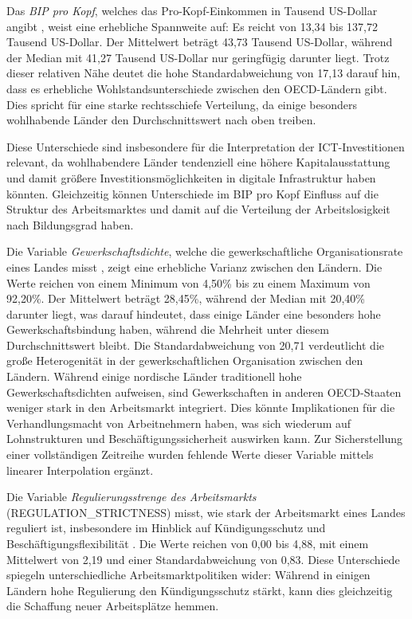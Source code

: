 Das \textit{\ac{BIP} pro Kopf}, welches das Pro-Kopf-Einkommen in Tausend US-Dollar angibt 
\parencite{oecd2022gdp}, weist eine erhebliche Spannweite auf: Es reicht von 13,34 bis 
137,72 Tausend US-Dollar. Der Mittelwert beträgt 43,73 Tausend US-Dollar, während der 
Median mit 41,27 Tausend US-Dollar nur geringfügig darunter liegt. Trotz dieser relativen 
Nähe deutet die hohe Standardabweichung von 17,13 darauf hin, dass es erhebliche 
Wohlstandsunterschiede zwischen den \ac{OECD}-Ländern gibt. Dies spricht für eine starke 
rechtsschiefe Verteilung, da einige besonders wohlhabende Länder den Durchschnittswert 
nach oben treiben.

Diese Unterschiede sind insbesondere für die Interpretation der \ac{ICT}-Investitionen 
relevant, da wohlhabendere Länder tendenziell eine höhere Kapitalausstattung und damit 
größere Investitionsmöglichkeiten in digitale Infrastruktur haben könnten. Gleichzeitig 
können Unterschiede im \ac{BIP} pro Kopf Einfluss auf die Struktur des Arbeitsmarktes und 
damit auf die Verteilung der Arbeitslosigkeit nach Bildungsgrad haben.

Die Variable \textit{Gewerkschaftsdichte}, welche die gewerkschaftliche Organisationsrate 
eines Landes misst \parencite{oecd2022tud}, zeigt eine erhebliche Varianz zwischen den 
Ländern. Die Werte reichen von einem Minimum von 4,50\% bis zu einem Maximum von 92,20\%. 
Der Mittelwert beträgt 28,45\%, während der Median mit 20,40\% darunter liegt, was darauf 
hindeutet, dass einige Länder eine besonders hohe Gewerkschaftsbindung haben, während die 
Mehrheit unter diesem Durchschnittswert bleibt. Die Standardabweichung von 20,71 
verdeutlicht die große Heterogenität in der gewerkschaftlichen Organisation zwischen den 
Ländern. Während einige nordische Länder traditionell hohe Gewerkschaftsdichten aufweisen, 
sind Gewerkschaften in anderen \ac{OECD}-Staaten weniger stark in den Arbeitsmarkt 
integriert. Dies könnte Implikationen für die Verhandlungsmacht von Arbeitnehmern haben, 
was sich wiederum auf Lohnstrukturen und Beschäftigungssicherheit auswirken kann.  
Zur Sicherstellung einer vollständigen Zeitreihe wurden fehlende Werte dieser Variable mittels linearer Interpolation ergänzt.

Die Variable \textit{Regulierungsstrenge des Arbeitsmarkts} (REGULATION\_STRICTNESS) misst, 
wie stark der Arbeitsmarkt eines Landes reguliert ist, insbesondere im Hinblick auf 
Kündigungsschutz und Beschäftigungsflexibilität \parencite{oecd2022regulation}. Die Werte 
reichen von 0,00 bis 4,88, mit einem Mittelwert von 2,19 und einer Standardabweichung von 
0,83. Diese Unterschiede spiegeln unterschiedliche Arbeitsmarktpolitiken wider: Während in 
einigen Ländern hohe Regulierung den Kündigungsschutz stärkt, kann dies gleichzeitig die 
Schaffung neuer Arbeitsplätze hemmen.

